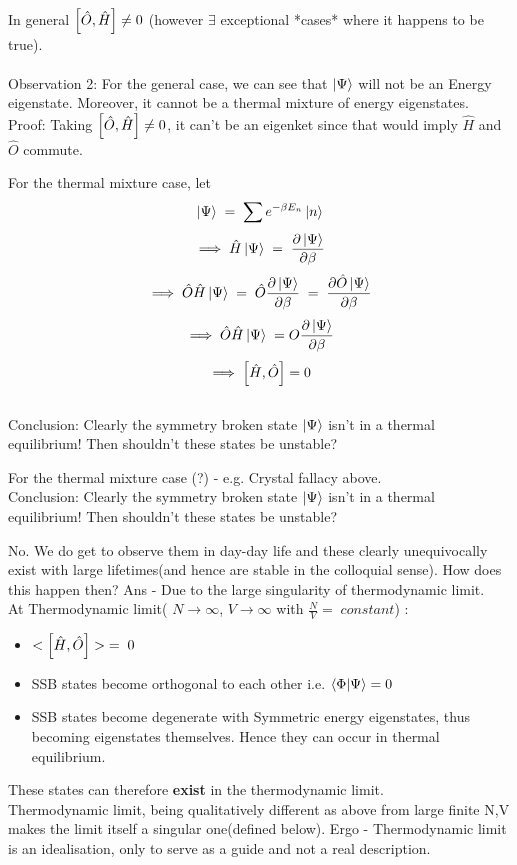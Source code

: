 \documentclass[12pt]{article}
\begin{document}
In general $\comm{\hat{O}}{\hat{H}}\neq 0$ (however $\exists$ exceptional *cases* where it happens to be true).\\
\\
Observation 2: For the general case, we can see that $\ket{\Psi}$ will not be an Energy eigenstate. Moreover, it cannot be a thermal mixture of energy eigenstates.\\
Proof: Taking $\comm{\hat{O}}{\hat{H}}\neq 0$, it can't be an eigenket since that would imply $\hat{H}$ and $\hat{O}$ commute.

For the thermal mixture case, let
$$\ket{\Psi}\;=\;\sum e^{-\beta E_n }\ket{n}$$
$$\implies \hat{H}\ket{\Psi}\;=\;\pdv{\ket{\Psi}}{\beta}$$
$$\implies \hat{O}\hat{H}\ket{\Psi}\;=\; \hat{O}\pdv{\ket{\Psi}}{\beta}\;=\;\pdv{\hat{O}\ket{\Psi}}{\beta}$$
$$\implies \hat{O}\hat{H}\ket{\Psi}\;= O \pdv{\ket{\Psi}}{\beta} $$
$$\implies \comm{\hat{H}}{\hat{O}}=0$$
\\
Conclusion: Clearly the symmetry broken state $\ket{\Psi}$ isn't in a thermal equilibrium! Then shouldn't these states be unstable?

For the thermal mixture case (?) - e.g. Crystal fallacy above.\\
\newline
Conclusion: Clearly the symmetry broken state $\ket{\Psi}$ isn't in a thermal equilibrium! Then shouldn't these states be unstable?

No. We do get to observe them in day-day life and these clearly unequivocally exist with large lifetimes(and hence are stable in the colloquial sense).
How does this happen then? Ans - Due to the large singularity of thermodynamic limit. \\
At Thermodynamic limit( $N\rightarrow \infty$, $V\rightarrow \infty$ with $\displaystyle{\frac{N}{V}=\; constant}$) :
\begin{itemize}
    \item  $<\comm{\hat{H}}{\hat{O}}>\;=\;0$
    \item SSB states become orthogonal to each other i.e. $\braket{\Phi}{\Psi}=0$
    \item SSB states become degenerate with Symmetric energy eigenstates, thus becoming eigenstates themselves. Hence they can occur in thermal equilibrium.
\end{itemize}
These states can therefore \textbf{exist} in the thermodynamic limit.\\
Thermodynamic limit, being qualitatively different as above from large finite N,V makes the limit itself a singular one(defined below). Ergo - Thermodynamic limit is an idealisation, only to serve as a guide and not a real description.
\end{document}
